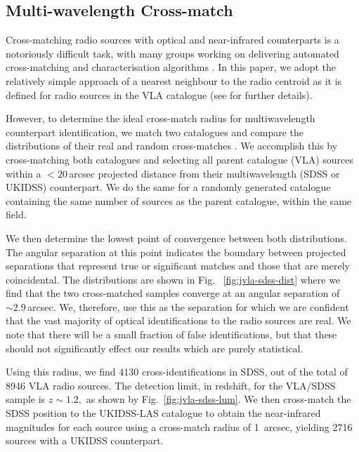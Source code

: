 \subsection{Multi-wavelength Cross-match}
Cross-matching radio sources with optical and near-infrared counterparts is a notoriously difficult task, with many groups working on delivering automated cross-matching and characterisation algorithms \citep[e.g.][]{prescott2018}. In this paper, we adopt the relatively simple approach of a nearest neighbour to the radio centroid as it is defined for radio sources in the VLA catalogue (see \citet{heywood2016} for further details). 

However, to determine the ideal cross-match radius for multiwavelength counterpart identification, we match two catalogues and compare the distributions of their real and random cross-matches \citep{prescott2016}. We accomplish this by cross-matching both catalogues and selecting all parent catalogue (VLA) sources within a $<20$\,arcsec projected distance from their multiwavelength (SDSS or UKIDSS) counterpart. We do the same for a randomly generated catalogue containing the same number of sources as the parent catalogue, within the same field. 

We then determine the lowest point of convergence between both distributions. The angular separation at this point indicates the boundary between projected separations that represent true or significant matches and those that are merely coincidental. The distributions are shown in Fig.~ \ref{fig:jvla-sdss-dist} where we find that the two cross-matched samples converge at an angular separation of $\sim 2.9$\,arcsec. We, therefore, use this as the separation for which we are confident that the vast majority of optical identifications to the radio sources are real. We note that there will be a small fraction of false identifications, but that these should not significantly effect our results which are purely statistical.

Using this radius, we find 4130 cross-identifications in SDSS, out of the total of 8946 VLA radio sources. The detection limit, in redshift, for the VLA/SDSS sample is $z\sim1.2,$ as shown by Fig.~\ref{fig:jvla-sdss-lum}. We then cross-match the SDSS position to the UKIDSS-LAS catalogue to obtain the near-infrared magnitudes for each source using a cross-match radius of 1~arcsec, yielding 2716 sources with a UKIDSS counterpart. 

